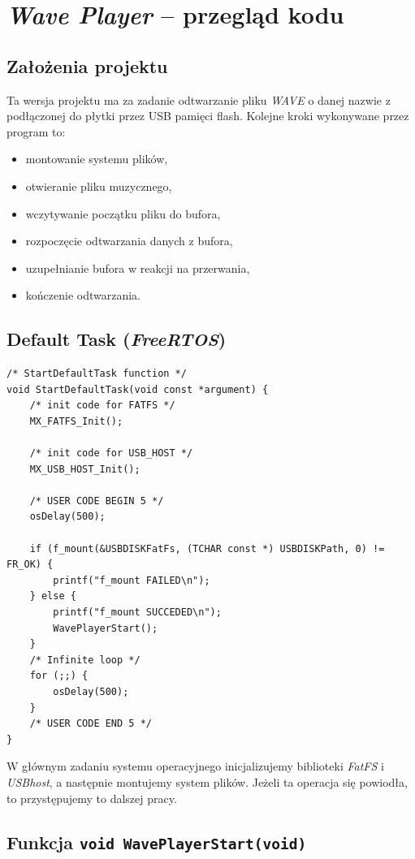 \documentclass[12pt,a4paper]{article}
\begin{document}
\section{\emph{Wave Player} -- przegląd kodu}

\subsection{Założenia projektu}
Ta wersja projektu ma za zadanie odtwarzanie pliku \emph{WAVE} o danej nazwie z podłączonej do płytki przez USB pamięci flash. Kolejne kroki wykonywane przez program to:
\begin{itemize}
 \item montowanie systemu plików,
 \item otwieranie pliku muzycznego,
 \item wczytywanie początku pliku do bufora,
 \item rozpoczęcie odtwarzania danych z bufora,
 \item uzupełnianie bufora w reakcji na przerwania,
 \item kończenie odtwarzania.
\end{itemize}

\subsection{Default Task (\emph{FreeRTOS})}

\begin{lstlisting}
/* StartDefaultTask function */
void StartDefaultTask(void const *argument) {
    /* init code for FATFS */
    MX_FATFS_Init();

    /* init code for USB_HOST */
    MX_USB_HOST_Init();

    /* USER CODE BEGIN 5 */
    osDelay(500);

    if (f_mount(&USBDISKFatFs, (TCHAR const *) USBDISKPath, 0) != FR_OK) {
        printf("f_mount FAILED\n");
    } else {
        printf("f_mount SUCCEDED\n");
        WavePlayerStart();
    }
    /* Infinite loop */
    for (;;) {
        osDelay(500);
    }
    /* USER CODE END 5 */
}
\end{lstlisting}

W głównym zadaniu systemu operacyjnego inicjalizujemy biblioteki \emph{FatFS} i \emph{USBhost}, a następnie montujemy system plików. Jeżeli ta operacja się powiodła, to przystępujemy to dalszej pracy. \newpage

\subsection{Funkcja \texttt{void WavePlayerStart(void)}}
\end{document}
